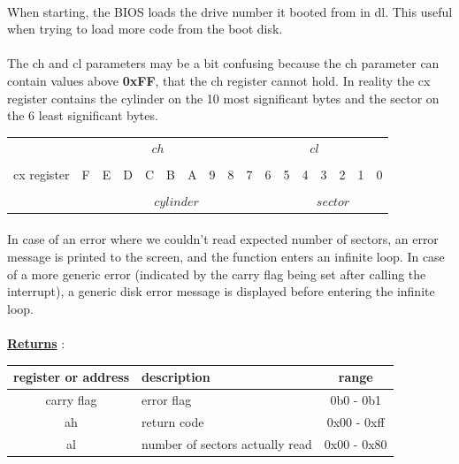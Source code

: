 \documentclass[12pt,letterpaper]{article}
\begin{document}
\paragraph{}
When starting, the BIOS loads the drive number it booted from in dl. This useful when trying to load more code from the boot disk.

\paragraph{}
The ch and cl parameters may be a bit confusing because the ch parameter can contain values above \textbf{0xFF}, that the ch register cannot hold. In reality the cx register contains the cylinder on the 10 most significant bytes and the sector on the 6 least significant bytes.

\begin{center}
\begin{tabularx}{0.9\textwidth}{ |Y|c|c|c|c|c|c|c|c||c|c|c|c|c|c|c|c| }
     & & \\
     & & \\
    \hline
    cx register & F & E & D & C & B & A & 9 & 8 & 7 & 6 & 5 & 4 & 3 & 2 & 1 & 0 \\
    \hline
     & & \\[-1ex]
     & & \\
\end{tabularx}
\end{center}

\paragraph{}
In case of an error where we couldn't read expected number of sectors, an error message is printed to the screen, and the function enters an infinite loop. In case of a more generic error (indicated by the carry flag being set after calling the interrupt), a generic disk error message is displayed before entering the infinite loop.

\paragraph{}
\textbf{\underline{Returns}} :
\begin{center}
\begin{tabularx}{0.9\textwidth}{ |c|Y|c| }
    \hline
    register or address & description & range \\
    \hline
    \hline
    carry flag & error flag & 0b0 - 0b1 \\
    \hline
    ah & return code & 0x00 - 0xff \\
    \hline
    al & number of sectors actually read & 0x00 - 0x80 \\
    \hline
\end{tabularx}
\end{center}
\end{document}

